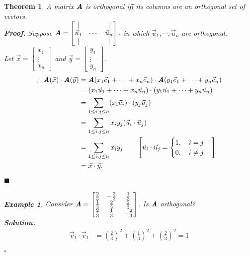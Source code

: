 \documentclass[12pt, a4paper]{article}
\newtheorem{thm}{Theorem}[subsection]
\newtheorem{eg}{Example}[subsection]
\newenvironment*{sol}{\indent\textbf{Solution. }}{\hfill{$\square$}\par}
\newenvironment*{prf}{\indent\textbf{\textit{Proof. }}}{\hfill $\blacksquare$\par}
\def\vecx{\vec{x}}
\def\vecy{\vec{y}}
\def\vecv{\vec{v}}
\def\vecu{\vec{u}}
\def\vece{\vec{e}}
\def\matrixA{\textbf{\emph{A}}}
\begin{document}
\begin{thm}
	A matrix $\matrixA$ is orthogonal \emph{iff} its columns are an orthogonal set of vectors. \\
	\begin{prf}
		Suppose $\matrixA=\begin{bmatrix}|&&|\\\vecu_1&\cdots&\vecu_n\\|&&|\end{bmatrix},$ in which $\vecu_1,\cdots,\vecu_n$ are orthogonal. \\
		Let $\vecx=\begin{bmatrix}x_1\\\vdots\\x_n\end{bmatrix}$ and $\vecy=\begin{bmatrix}y_1\\\vdots\\y_n\end{bmatrix}$.
		$$\begin{aligned}
			\therefore\matrixA(\vecx)\cdot\matrixA(\vecy)&=\matrixA(x_1\vece_1+\cdots+x_n\vece_n)\cdot\matrixA(y_1\vece_1+\cdots+y_n\vece_n)\\
			&=(x_1\vecu_1+\cdots+x_n\vecu_n)\cdot(y_1\vecu_1+\cdots+y_n\vecu_n)\\
			&=\sum_{1\leq i,j\leq n}(x_i\vecu_i)\cdot (y_j\vecu_j)\\
			&=\sum_{1\leq i,j\leq n}x_iy_j(\vecu_i\cdot\vecu_j)\\
			&=\sum_{1\leq i,j\leq n}x_iy_j\qquad\left[\vecu_i\cdot\vecu_j=\begin{cases}1,\quad i=j\\0,\quad i\neq j\end{cases}\right]\\
			&=\vecx\cdot\vecy.
		\end{aligned}$$
	\end{prf}
	\begin{eg}
		Consider $\matrixA=\begin{bmatrix}\frac{2}{3}&-\frac{2}{3}&\frac{1}{3}\\\frac{1}{3}&\frac{2}{3}&\frac{2}{3}\\\frac{2}{3}&\frac{1}{3}&-\frac{2}{3}\end{bmatrix}$. Is $\matrixA$ orthogonal?\\
		\begin{sol}
			$$\begin{aligned}
				\vecv_1\cdot\vecv_1&=\left(\frac{2}{3}\right)^2+\left(\frac{1}{3}\right)^2+\left(\frac{2}{3}\right)^2=1	\\

\end{aligned}$$
\end{sol}
\end{eg}
\end{thm}
\end{document}
